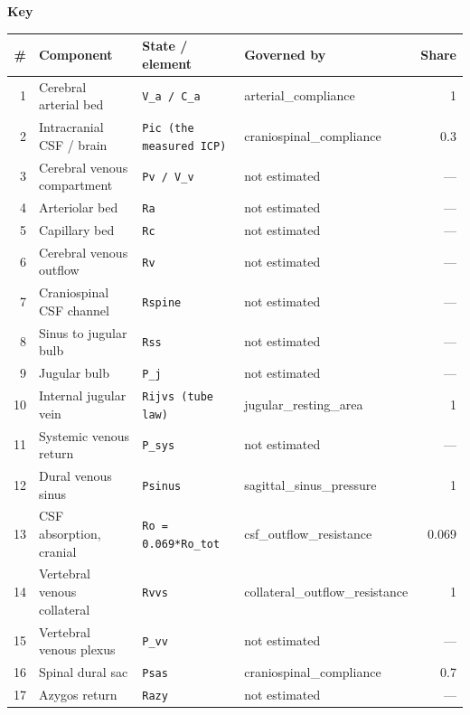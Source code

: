 \documentclass[11pt]{article}
\begin{document}
\vspace{5mm}
{\sffamily\bfseries\large Key\par}
\vspace{2mm}
\begin{tabular}{@{}r l l l r@{}}
\toprule
\# & Component & State / element & Governed by & Share \\
\midrule
1 & Cerebral arterial bed & \texttt{\small V\_a / C\_a} & {\small arterial\_compliance} & 1 \\
2 & Intracranial CSF / brain & \texttt{\small Pic (the measured ICP)} & {\small craniospinal\_compliance} & 0.3 \\
3 & Cerebral venous compartment & \texttt{\small Pv / V\_v} & {\small \color{ungov}not estimated} & --- \\
4 & Arteriolar bed & \texttt{\small Ra} & {\small \color{ungov}not estimated} & --- \\
5 & Capillary bed & \texttt{\small Rc} & {\small \color{ungov}not estimated} & --- \\
6 & Cerebral venous outflow & \texttt{\small Rv} & {\small \color{ungov}not estimated} & --- \\
7 & Craniospinal CSF channel & \texttt{\small Rspine} & {\small \color{ungov}not estimated} & --- \\
8 & Sinus to jugular bulb & \texttt{\small Rss} & {\small \color{ungov}not estimated} & --- \\
9 & Jugular bulb & \texttt{\small P\_j} & {\small \color{ungov}not estimated} & --- \\
10 & Internal jugular vein & \texttt{\small Rijvs (tube law)} & {\small jugular\_resting\_area} & 1 \\
11 & Systemic venous return & \texttt{\small P\_sys} & {\small \color{ungov}not estimated} & --- \\
12 & Dural venous sinus & \texttt{\small Psinus} & {\small sagittal\_sinus\_pressure} & 1 \\
13 & CSF absorption, cranial & \texttt{\small Ro = 0.069*Ro\_tot} & {\small csf\_outflow\_resistance} & 0.069 \\
14 & Vertebral venous collateral & \texttt{\small Rvvs} & {\small collateral\_outflow\_resistance} & 1 \\
15 & Vertebral venous plexus & \texttt{\small P\_vv} & {\small \color{ungov}not estimated} & --- \\
16 & Spinal dural sac & \texttt{\small Psas} & {\small craniospinal\_compliance} & 0.7 \\
17 & Azygos return & \texttt{\small Razy} & {\small \color{ungov}not estimated} & --- \\

\end{tabular}
\end{document}
